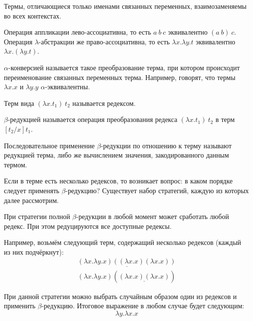 \begin{remark}
    Термы, отличающиеся только именами связанных переменных, взаимозаменяемы во всех контекстах.
\end{remark}

\begin{remark}
    Операция аппликации лево-ассоциативна, то есть $a\ b\ c$ эквивалентно $(a\ b)\ c$. Операция $\lambda$-абстракции же право-ассоциативна, то есть $\lambda x. \lambda y. t$ эквивалентно $\lambda x. (\lambda y. t)$.
\end{remark}

\begin{definition}
    $\alpha$-конверсией называется такое преобразование терма, при котором происходит переименование связанных переменных терма. Например, говорят, что термы $\lambda x.x$ и $\lambda y.y$ $\alpha$-эквивалентны.
\end{definition}

\begin{definition}
    Терм вида $(\lambda x. t_1)\ t_2$ называется редексом.
\end{definition}

\begin{definition}
    $\beta$-редукцией называется операция преобразования редекса $(\lambda x.t_1)\ t_2$ в терм $[t_2/x]t_1$.
\end{definition}

\begin{definition}
    Последовательное применение $\beta$-редукции по отношению к терму называют редукцией терма, либо же вычислением значения, закодированного данным термом.
\end{definition}

\begin{remark}
    Если в терме есть несколько редексов, то возникает вопрос: в каком порядке следует применять $\beta$-редукцию? Существует набор стратегий, каждую из которых далее рассмотрим.
\end{remark}

\begin{definition}
    При стратегии полной $\beta$-редукции в любой момент может сработать любой редекс. При этом редуцируются все доступные редексы.

    Например, возьмём следующий терм, содержащий несколько редексов (каждый из них подчёркнут):
    \begin{equation*}
        \begin{matrix}
            \underline{(\lambda x. \lambda y. x)((\lambda x.x)(\lambda x.x))} \\
        (\lambda x. \lambda y. x)(\underline{(\lambda x.x)(\lambda x.x)})
        \end{matrix}
    \end{equation*}

    При данной стратегии можно выбрать случайным образом один из редексов и применить $\beta$-редукцию. Итоговое выражение в любом случае будет следующим:
    \begin{equation*}
        \lambda y.\lambda x. x
    \end{equation*}
\end{definition}

